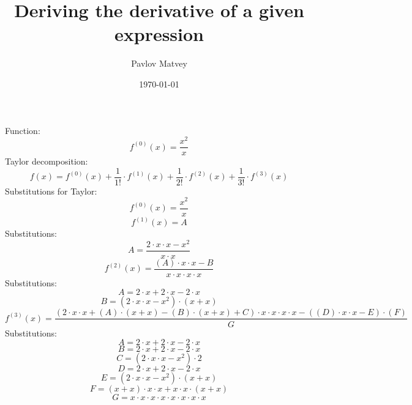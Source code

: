 \documentclass[12pt, letterpaper]{article}
\title {Deriving the derivative of a given expression}
\author{Pavlov Matvey}
\date{\today}
\begin{document}
\maketitle
Function:\[f^{(0)}(x)=\frac{x^2}{x}\]
Taylor decomposition:
\[f(x)=f^{(0)}(x)+ \frac {1}{1!} \cdot f^{(1)}(x)+ \frac {1}{2!} \cdot f^{(2)}(x)+ \frac {1}{3!} \cdot f^{(3)}(x)\]
Substitutions for Taylor:
\[f^{(0)}(x)=\frac{x^2}{x}\]
\[f^{(1)}(x)=A\]
Substitutions:
\[A=\frac{2 \cdot x \cdot x-x^2}{x \cdot x}\]
\[f^{(2)}(x)=\frac{(A) \cdot x \cdot x-B}{x \cdot x \cdot x \cdot x}\]
Substitutions:
\[A=2 \cdot x+2 \cdot x-2 \cdot x\]
\[B=(2 \cdot x \cdot x-x^2) \cdot (x+x)\]
\[f^{(3)}(x)=\frac{(2 \cdot x \cdot x+(A) \cdot (x+x)-(B) \cdot (x+x)+C) \cdot x \cdot x \cdot x \cdot x-((D) \cdot x \cdot x-E) \cdot (F)}{G}\]
Substitutions:
\[A=2 \cdot x+2 \cdot x-2 \cdot x\]
\[B=2 \cdot x+2 \cdot x-2 \cdot x\]
\[C=(2 \cdot x \cdot x-x^2) \cdot 2\]
\[D=2 \cdot x+2 \cdot x-2 \cdot x\]
\[E=(2 \cdot x \cdot x-x^2) \cdot (x+x)\]
\[F=(x+x) \cdot x \cdot x+x \cdot x \cdot (x+x)\]
\[G=x \cdot x \cdot x \cdot x \cdot x \cdot x \cdot x \cdot x\]
\end{document}
